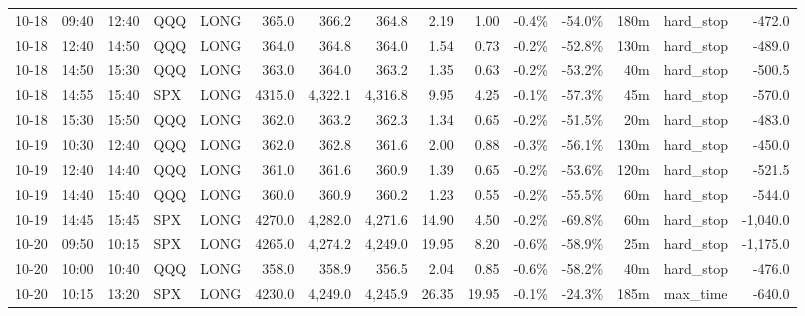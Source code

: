 \documentclass[11pt,a4paper,twoside]{article}
\begin{document}
\begin{landscape}
\begin{center}
\begin{longtable}{>{\color{txtmain}}l l l l l r r r r r r r r >{\color{txtmain}}l r}
10-18 & 09:40 & 12:40 & QQQ & LONG & 365.0 & 366.2 & 364.8 & 2.19 & 1.00 & \textcolor{lossred}{-0.4\%} & \textcolor{lossred}{-54.0\%} & 180m & hard\_stop & \textcolor{lossred}{-472.0} \\
10-18 & 12:40 & 14:50 & QQQ & LONG & 364.0 & 364.8 & 364.0 & 1.54 & 0.73 & \textcolor{lossred}{-0.2\%} & \textcolor{lossred}{-52.8\%} & 130m & hard\_stop & \textcolor{lossred}{-489.0} \\
10-18 & 14:50 & 15:30 & QQQ & LONG & 363.0 & 364.0 & 363.2 & 1.35 & 0.63 & \textcolor{lossred}{-0.2\%} & \textcolor{lossred}{-53.2\%} & 40m & hard\_stop & \textcolor{lossred}{-500.5} \\
10-18 & 14:55 & 15:40 & SPX & LONG & 4315.0 & 4,322.1 & 4,316.8 & 9.95 & 4.25 & \textcolor{lossred}{-0.1\%} & \textcolor{lossred}{-57.3\%} & 45m & hard\_stop & \textcolor{lossred}{-570.0} \\
10-18 & 15:30 & 15:50 & QQQ & LONG & 362.0 & 363.2 & 362.3 & 1.34 & 0.65 & \textcolor{lossred}{-0.2\%} & \textcolor{lossred}{-51.5\%} & 20m & hard\_stop & \textcolor{lossred}{-483.0} \\
10-19 & 10:30 & 12:40 & QQQ & LONG & 362.0 & 362.8 & 361.6 & 2.00 & 0.88 & \textcolor{lossred}{-0.3\%} & \textcolor{lossred}{-56.1\%} & 130m & hard\_stop & \textcolor{lossred}{-450.0} \\
10-19 & 12:40 & 14:40 & QQQ & LONG & 361.0 & 361.6 & 360.9 & 1.39 & 0.65 & \textcolor{lossred}{-0.2\%} & \textcolor{lossred}{-53.6\%} & 120m & hard\_stop & \textcolor{lossred}{-521.5} \\
10-19 & 14:40 & 15:40 & QQQ & LONG & 360.0 & 360.9 & 360.2 & 1.23 & 0.55 & \textcolor{lossred}{-0.2\%} & \textcolor{lossred}{-55.5\%} & 60m & hard\_stop & \textcolor{lossred}{-544.0} \\
10-19 & 14:45 & 15:45 & SPX & LONG & 4270.0 & 4,282.0 & 4,271.6 & 14.90 & 4.50 & \textcolor{lossred}{-0.2\%} & \textcolor{lossred}{-69.8\%} & 60m & hard\_stop & \textcolor{lossred}{-1,040.0} \\
10-20 & 09:50 & 10:15 & SPX & LONG & 4265.0 & 4,274.2 & 4,249.0 & 19.95 & 8.20 & \textcolor{lossred}{-0.6\%} & \textcolor{lossred}{-58.9\%} & 25m & hard\_stop & \textcolor{lossred}{-1,175.0} \\
10-20 & 10:00 & 10:40 & QQQ & LONG & 358.0 & 358.9 & 356.5 & 2.04 & 0.85 & \textcolor{lossred}{-0.6\%} & \textcolor{lossred}{-58.2\%} & 40m & hard\_stop & \textcolor{lossred}{-476.0} \\
10-20 & 10:15 & 13:20 & SPX & LONG & 4230.0 & 4,249.0 & 4,245.9 & 26.35 & 19.95 & \textcolor{lossred}{-0.1\%} & \textcolor{lossred}{-24.3\%} & 185m & max\_time & \textcolor{lossred}{-640.0} \\

\end{longtable}
\end{center}
\end{landscape}
\end{document}
